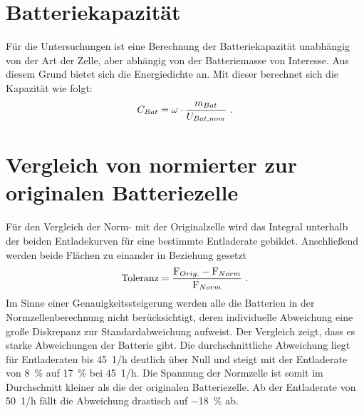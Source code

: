 \begin{appendix}
\section{Batteriekapazität}
Für die Untersuchungen ist eine Berechnung der Batteriekapazität unabhängig von der Art der Zelle, aber abhängig von der Batteriemasse von Interesse.
Aus diesem Grund bietet sich die Energiedichte an. 
Mit dieser berechnet sich die Kapazität wie folgt:
\begin{equation}
	C_{Bat}	= \omega\cdot\frac{m_{Bat}}{U_{Bat,nom}} ~\text{.}
	\label{eq:batteriekapazitaet}
\end{equation}


\section{Vergleich von normierter zur originalen Batteriezelle}
Für den Vergleich der Norm- mit der Originalzelle wird das Integral unterhalb der beiden Entladekurven für eine bestimmte Entladerate gebildet. Anschließend werden beide Flächen zu einander in Beziehung gesetzt 
\begin{equation}
	\text{Toleranz} = \frac{\text{F}_{Orig.}-\text{F}_{Norm}}{\text{F}_{Norm}} ~\text{.}
\end{equation} 
Im Sinne einer Genauigkeitssteigerung werden alle die Batterien in der Normzellenberechnung nicht berücksichtigt, deren individuelle Abweichung eine große Diskrepanz zur Standardabweichung aufweist. Der Vergleich zeigt, dass es starke Abweichungen der Batterie gibt. Die durchschnittliche Abweichung liegt für Entladeraten bis \SI{45}{1/h} deutlich über Null und steigt mit der Entladerate von \SI{8}{\%} auf \SI{17}{\%} bei \SI{45}{1/h}. Die Spannung der Normzelle ist somit im Durchschnitt kleiner als die der originalen Batteriezelle. Ab der Entladerate von \SI{50}{1/h} fällt die Abweichung drastisch auf \SI{-18}{\%} ab. 




\end{appendix}
